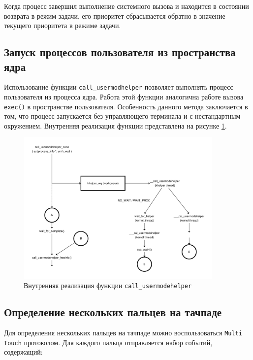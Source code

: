 Когда процесс завершил выполнение системного вызова и находится в состоянии возврата в режим задачи, его приоритет сбрасывается обратно в значение текущего приоритета в режиме задачи.

\subsection{Запуск процессов пользователя из пространства ядра}

Использование функции \texttt{call\_usermodhelper} \cite{src} позволяет выполнять процесс пользователя из процесса ядра. Работа этой функции аналогична работе вызова \texttt{exec()} в пространстве пользователя. Особенность данного метода заключается в том, что процесс запускается без управляющего терминала и с нестандартным окружением. Внутренняя реализация функции представлена на рисунке \ref{fig:umh}.

\clearpage

\begin{figure}[h!btp]
	\centering
	\includegraphics[width=0.9\textwidth]{inc/usermodehelper.pdf}
	\caption{Внутренняя реализация функции \texttt{call\_usermodehelper}}
	\label{fig:umh}	
\end{figure}

\subsection{Определение нескольких пальцев на тачпаде}

Для определения нескольких пальцев на тачпаде можно воспользоваться \texttt{Multi Touch} протоколом. Для каждого пальца отправляется набор событий, содержащий: 

